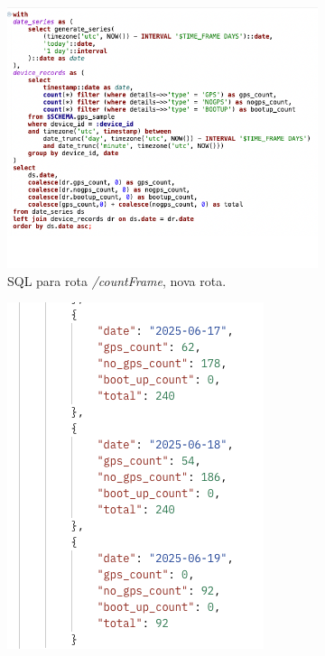 \begin{figure}[!h]
	\centering
	\begin{subfigure}[c]{0.45\textwidth}
		\centering
		\includegraphics[width=\textwidth]{figs/sqlCountFrame.png}
		\caption{SQL para rota \textit{/countFrame}, nova rota.}
		\label{fig:sqlCountFrame}
	\end{subfigure}
	\hfill
	\begin{subfigure}[c]{0.45\textwidth}
        \centering
        \includegraphics[width=\textwidth]{figs/return_new_query.png}

\end{subfigure}
\end{figure}
